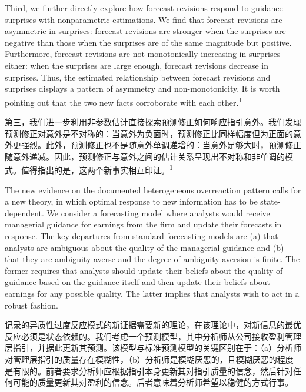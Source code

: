 \documentclass[12pt,a4paper]{article}
\newenvironment{original}
  {\par\medskip\noindent\ignorespaces}
  {\par\medskip}
\newenvironment{translation}
  {\par\noindent{\color{transblue}\ignorespaces}}
  {\par\bigskip}
\begin{document}
\begin{original}
Third, we further directly explore how forecast revisions respond to guidance surprises with nonparametric estimations. We find that forecast revisions are asymmetric in surprises: forecast revisions are stronger when the surprises are negative than those when the surprises are of the same magnitude but positive. Furthermore, forecast revisions are not monotonically increasing in surprises either: when the surprises are large enough, forecast revisions decrease in surprises. Thus, the estimated relationship between forecast revisions and surprises displays a pattern of asymmetry and non-monotonicity. It is worth pointing out that the two new facts corroborate with each other.\textsuperscript{1}
\end{original}
\begin{translation}
第三，我们进一步利用非参数估计直接探索预测修正如何响应指引意外。我们发现预测修正对意外是不对称的：当意外为负面时，预测修正比同样幅度但为正面的意外更强烈。此外，预测修正也不是随意外单调递增的：当意外足够大时，预测修正随意外递减。因此，预测修正与意外之间的估计关系呈现出不对称和非单调的模式。值得指出的是，这两个新事实相互印证。\textsuperscript{1}
\end{translation}

\begin{original}
The new evidence on the documented heterogeneous overreaction pattern calls for a new theory, in which optimal response to new information has to be state-dependent. We consider a forecasting model where analysts would receive managerial guidance for earnings from the firm and update their forecasts in response. The key departures from standard forecasting models are (a) that analysts are ambiguous about the quality of the managerial guidance and (b) that they are ambiguity averse and the degree of ambiguity aversion is finite. The former requires that analysts should update their beliefs about the quality of guidance based on the guidance itself and then update their beliefs about earnings for any possible quality. The latter implies that analysts wish to act in a robust fashion.
\end{original}
\begin{translation}
记录的异质性过度反应模式的新证据需要新的理论，在该理论中，对新信息的最优反应必须是状态依赖的。我们考虑一个预测模型，其中分析师从公司接收盈利管理层指引，并据此更新其预测。该模型与标准预测模型的关键区别在于：（a）分析师对管理层指引的质量存在模糊性，（b）分析师是模糊厌恶的，且模糊厌恶的程度是有限的。前者要求分析师应根据指引本身更新其对指引质量的信念，然后针对任何可能的质量更新其对盈利的信念。后者意味着分析师希望以稳健的方式行事。
\end{translation}
\end{document}
